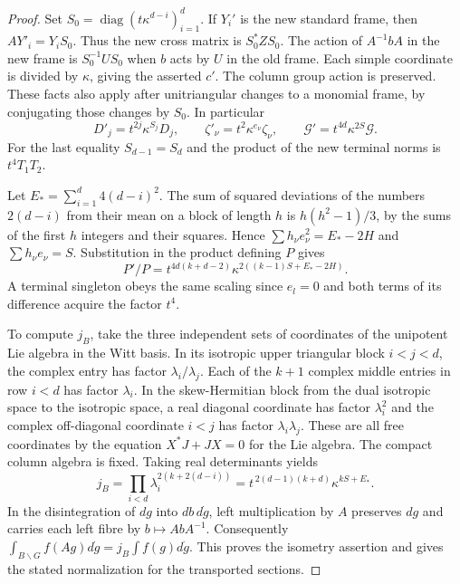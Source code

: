 \documentclass[a4paper,11pt]{article}
\theoremstyle{definition}
\theoremstyle{remark}
\numberwithin{equation}{section}
\begin{document}
\begin{proof}
Set \(S_0=\operatorname{diag}(t\kappa^{d-i})_{i=1}^d\).
If \(Y_i'\) is the new standard frame, then \(A Y'_i=Y_i S_0\).
Thus the new cross matrix is \(S_0^* Z S_0\). The action of
\(A^{-1}bA\) in the new frame is \(S_0^{-1} U S_0\) when
\(b\) acts by \(U\) in the old frame. Each simple coordinate
is divided by \(\kappa\), giving the asserted \(c'\). The
column group action is preserved. These facts also apply after
unitriangular changes to a monomial frame, by conjugating those
changes by \(S_0\). In particular
\[
 D'_j=t^{2j}\kappa^{S_j}D_j,\qquad
 \zeta'_\nu=t^2\kappa^{e_\nu}\zeta_\nu,\qquad
 \mathcal G'=t^{4d}\kappa^{2S}\mathcal G .
\]
For the last equality \(S_{d-1}=S_d\) and the product of
the new terminal norms is \(t^4T_1T_2\).

Let \(E_*=\sum_{i=1}^d 4(d-i)^2\). The sum of squared deviations
of the numbers \(2(d-i)\) from their mean on a block of length
\(h\) is \(h(h^2-1)/3\), by the sums of the first \(h\) integers
and their squares. Hence
\(\sum h_\nu e_\nu^2=E_*-2H\) and \(\sum h_\nu e_\nu=S\).
Substitution in the product defining \(P\) gives
\begin{equation}
       P'/P=t^{4d(k+d-2)}
               \kappa^{2((k-1)S+E_*-2H)}.               \label{eq:pscale207}
\end{equation}
A terminal singleton obeys the same scaling since \(e_l=0\)
and both terms of its difference acquire the factor \(t^4\).

To compute \(j_B\), take the three independent sets of coordinates
of the unipotent Lie algebra in the Witt basis. In its isotropic
upper triangular block \(i<j<d\), the complex entry has factor
\(\lambda_i/\lambda_j\). Each of the \(k+1\) complex middle entries
in row \(i<d\) has factor \(\lambda_i\). In the skew-Hermitian
block from the dual isotropic space to the isotropic space, a real
diagonal coordinate has factor \(\lambda_i^2\) and the complex
off-diagonal coordinate \(i<j\) has factor \(\lambda_i\lambda_j\).
These are all free coordinates by the equation \(X^*J+JX=0\)
for the Lie algebra. The compact column algebra is fixed.
Taking real determinants yields
\[
 j_B=\prod_{i<d}\lambda_i^{2(k+2(d-i))}
      =t^{\,2(d-1)(k+d)}\kappa^{kS+E_*}.
\]
In the disintegration of \(dg\) into \(db\,d\dot g\), left
multiplication by \(A\) preserves \(dg\) and carries each left
fibre by \(b\mapsto AbA^{-1}\). Consequently
\(\int_{B\backslash G} f(Ag)d\dot g=j_B\int f(g)d\dot g\).
This proves the isometry assertion and gives the stated
normalization for the transported sections.


\end{proof}
\end{document}
